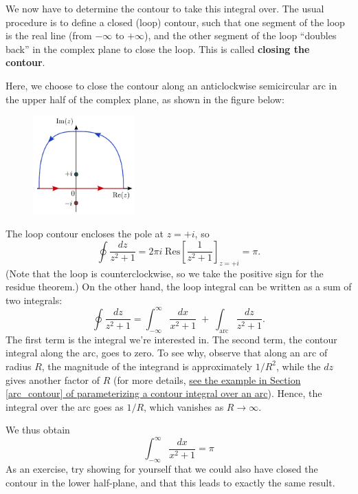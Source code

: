 \documentclass[10pt,a4paper]{article}
\begin{document}
We now have to determine the contour to take this integral over. The
usual procedure is to define a closed (loop) contour, such that one
segment of the loop is the real line (from $-\infty$ to $+\infty$),
and the other segment of the loop ``doubles back'' in the complex
plane to close the loop. This is called \textbf{closing the contour}.

Here, we choose to close the contour along an anticlockwise
semicircular arc in the upper half of the complex plane, as shown in
the figure below:

\begin{figure}[h]
  \centering\includegraphics[width=0.35\textwidth]{contour_example2}
\end{figure}

The loop contour encloses the pole at $z = +i$, so
\begin{equation}
  \oint \frac{dz}{z^2+1} = 2\pi i \; \mathrm{Res}\left[\frac{1}{z^2 + 1}\right]_{z = +i} = \pi.
\end{equation}
(Note that the loop is counterclockwise, so we take the positive sign
for the residue theorem.) On the other hand, the loop integral can be
written as a sum of two integrals:
\begin{equation}
  \oint \frac{dz}{z^2 + 1} = \int_{-\infty}^\infty \frac{dx}{x^2 + 1}
  \;+\; \int_{\mathrm{arc}} \frac{dz}{z^2 + 1}.
\end{equation}
The first term is the integral we're interested in. The second term,
the contour integral along the arc, goes to zero. To see why, observe
that along an arc of radius $R$, the magnitude of the integrand is
approximately $1/R^{2}$, while the $dz$ gives another factor of $R$
(for more details, \hyperref[arc_contour]{see the example in Section
  \ref{arc_contour} of parameterizing a contour integral over an
  arc}). Hence, the integral over the arc goes as $1/R$, which
vanishes as $R \rightarrow \infty$.

We thus obtain
\begin{equation}
\int_{-\infty}^\infty \frac{dx}{x^2 + 1} = \pi
\end{equation}
As an exercise, try showing for yourself that we could also have
closed the contour in the lower half-plane, and that this leads to
exactly the same result.
\end{document}
